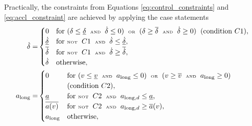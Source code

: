 Practically, the constraints from Equations \ref{eq:control_constraints} and \ref{eq:accl_constraint} are achieved by applying the case statements 
\begin{equation}
\begin{split}
    \dot{\delta} = 
    &\begin{cases}
    0 & \text{for } (\delta \leq \underline{\delta}  \hspace{0.2cm}\text{\tiny AND}\hspace{0.2cm} \dot{\delta} \leq 0)  \hspace{0.2cm}\text{\tiny OR}\hspace{0.2cm} (\delta \geq \overline{\delta}  \hspace{0.2cm}\text{\tiny AND}\hspace{0.2cm} \dot{\delta} \geq 0) \hspace{0.2cm} (\text{condition } C1), \\
    \underline{\dot{\delta}} & \text{for } \text{\tiny NOT}\hspace{0.2cm} C1 \hspace{0.2cm}\text{\tiny AND}\hspace{0.2cm} \dot{\delta} \leq \underline{\dot{\delta}}, \\
    \overline{\dot{\delta}} & \text{for } \text{\tiny NOT}\hspace{0.2cm} C1 \hspace{0.2cm}\text{\tiny AND}\hspace{0.2cm} \dot{\delta} \geq \overline{\dot{\delta}}, \\
    \dot{\delta} & \text{otherwise},
    \end{cases}\\
    a_{\text{long}} = 
    &\begin{cases}
    0 & \text{for } (v \leq \underline{v} \hspace{0.2cm}\text{\tiny AND}\hspace{0.2cm} a_{\text{long}} \leq 0) \hspace{0.2cm}\text{\tiny OR}\hspace{0.2cm} (v \geq \overline{v} \hspace{0.2cm}\text{\tiny AND}\hspace{0.2cm} a_{\text{long}} \geq 0) \hspace{0.2cm} \\ & (\text{condition } C2), \\
    \underline{a} & \text{for } \text{\tiny NOT}\hspace{0.2cm} C2 \hspace{0.2cm}\text{\tiny AND}\hspace{0.2cm} a_{\text{long},d} \leq \underline{a}, \\
    \overline{a(v)} & \text{for } \text{\tiny NOT}\hspace{0.2cm} C2 \hspace{0.2cm}\text{\tiny AND}\hspace{0.2cm} a_{\text{long},d} \geq \overline{a}(v), \\
    a_{\text{long}} & \text{otherwise},
    \end{cases}
\end{split}
\label{eq:vehicle_control_actions}
\end{equation}
